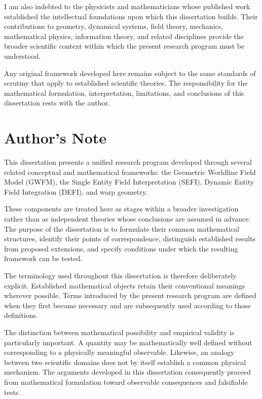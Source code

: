 \documentclass[12pt,oneside]{book}
\begin{document}
I am also indebted to the physicists and mathematicians whose
published work established the intellectual foundations upon
which this dissertation builds. Their contributions to
geometry, dynamical systems, field theory, mechanics,
mathematical physics, information theory, and related
disciplines provide the broader scientific context within which
the present research program must be understood.

Any original framework developed here remains subject to the
same standards of scrutiny that apply to established scientific
theories. The responsibility for the mathematical formulation,
interpretation, limitations, and conclusions of this
dissertation rests with the author.


\chapter*{Author's Note}

This dissertation presents a unified research program developed
through several related conceptual and mathematical frameworks:
the Geometric Worldline Field Model (GWFM), the Single Entity
Field Interpretation (SEFI), Dynamic Entity Field Integration
(DEFI), and warp geometry.

These components are treated here as stages within a broader
investigation rather than as independent theories whose
conclusions are assumed in advance. The purpose of the
dissertation is to formulate their common mathematical
structures, identify their points of correspondence, distinguish
established results from proposed extensions, and specify
conditions under which the resulting framework can be tested.

The terminology used throughout this dissertation is therefore
deliberately explicit. Established mathematical objects retain
their conventional meanings wherever possible. Terms introduced
by the present research program are defined when they first
become necessary and are subsequently used according to those
definitions.

The distinction between mathematical possibility and empirical
validity is particularly important. A quantity may be
mathematically well defined without corresponding to a
physically meaningful observable. Likewise, an analogy between
two scientific domains does not by itself establish a common
physical mechanism. The arguments developed in this
dissertation consequently proceed from mathematical
formulation toward observable consequences and falsifiable
tests.
\end{document}
